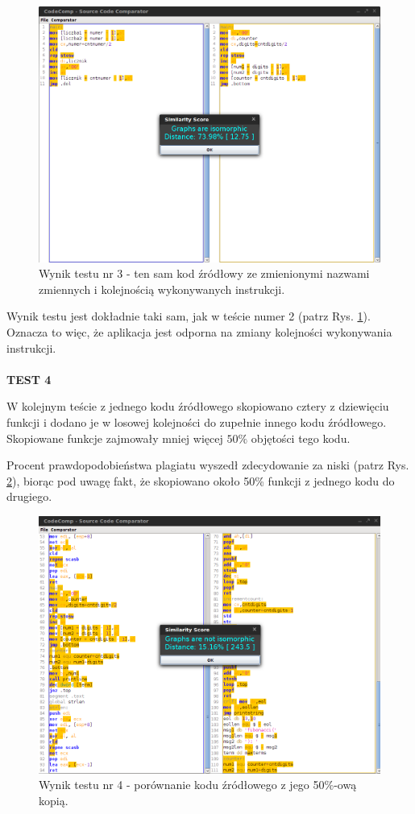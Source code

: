\documentclass[a4paper,12pt,twoside]{article}
\begin{document}
\begin{figure}[here]
\centering
\includegraphics[scale=0.4]{gfx/test3.png}
\caption{Wynik testu nr 3 - ten sam kod źródłowy ze zmienionymi nazwami zmiennych i kolejnością wykonywanych instrukcji.}
\label{fig:test3}
\end{figure}

Wynik testu jest dokładnie taki sam, jak w teście numer 2 (patrz Rys. \ref{fig:test3}). Oznacza to więc, że aplikacja jest odporna na zmiany kolejności wykonywania instrukcji.
\\
\pagebreak
\\
\textbf{TEST 4}

W kolejnym teście z jednego kodu źródłowego skopiowano cztery z dziewięciu funkcji i dodano je w losowej kolejności do zupełnie innego kodu źródłowego. Skopiowane funkcje zajmowały mniej więcej $50\%$ objętości tego kodu.

Procent prawdopodobieństwa plagiatu wyszedł zdecydowanie za niski (patrz Rys. \ref{fig:test4}), biorąc pod uwagę fakt, że skopiowano około 50\% funkcji z jednego kodu do drugiego.

\begin{figure}[h!]
\centering
\includegraphics[scale=0.4]{gfx/test4.png}
\caption{Wynik testu nr 4 - porównanie kodu źródłowego z jego 50$\%$-ową kopią.}
\label{fig:test4}
\end{figure}
\end{document}
